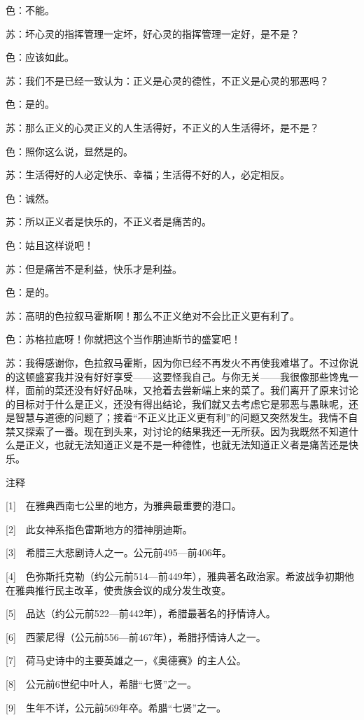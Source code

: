 \documentclass[12pt,oneside]{book}
\begin{document}
色：不能。

苏：坏心灵的指挥管理一定坏，好心灵的指挥管理一定好，是不是？

色：应该如此。

苏：我们不是已经一致认为：正义是心灵的德性，不正义是心灵的邪恶吗？

色：是的。

苏：那么正义的心灵正义的人生活得好，不正义的人生活得坏，是不是？

色：照你这么说，显然是的。

苏：生活得好的人必定快乐、幸福；生活得不好的人，必定相反。

色：诚然。

苏：所以正义者是快乐的，不正义者是痛苦的。

色：姑且这样说吧！

苏：但是痛苦不是利益，快乐才是利益。

色：是的。

苏：高明的色拉叙马霍斯啊！那么不正义绝对不会比正义更有利了。

色：苏格拉底呀！你就把这个当作朋迪斯节的盛宴吧！

苏：我得感谢你，色拉叙马霍斯，因为你已经不再发火不再使我难堪了。不过你说的这顿盛宴我并没有好好享受——这要怪我自己。与你无关——我很像那些馋鬼一样，面前的菜还没有好好品味，又抢着去尝新端上来的菜了。我们离开了原来讨论的目标对于什么是正义，还没有得出结论，我们就又去考虑它是邪恶与愚昧呢，还是智慧与道德的问题了；接着“不正义比正义更有利”的问题又突然发生。我情不自禁又探索了一番。现在到头来，对讨论的结果我还一无所获。因为我既然不知道什么是正义，也就无法知道正义是不是一种德性，也就无法知道正义者是痛苦还是快乐。

注释

[1]　在雅典西南七公里的地方，为雅典最重要的港口。

[2]　此女神系指色雷斯地方的猎神朋迪斯。

[3]　希腊三大悲剧诗人之一。公元前495—前406年。

[4]　色弥斯托克勒（约公元前514—前449年），雅典著名政治家。希波战争初期他在雅典推行民主改革，使贵族会议的成分发生改变。

[5]　品达（约公元前522—前442年），希腊最著名的抒情诗人。

[6]　西蒙尼得（公元前556—前467年），希腊抒情诗人之一。

[7]　荷马史诗中的主要英雄之一，《奥德赛》的主人公。

[8]　公元前6世纪中叶人，希腊“七贤”之一。

[9]　生年不详，公元前569年卒。希腊“七贤”之一。
\end{document}
